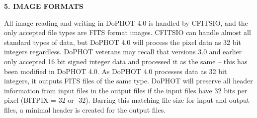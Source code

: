\centerline{\bf 5.  IMAGE FORMATS}

All image reading and writing in DoPHOT 4.0 is handled 
by CFITSIO, and the only accepted file types are FITS format images.  
CFITSIO can handle almost all standard types of data, but DoPHOT 
4.0 will process the pixel data as 32 bit integers regardless.  DoPHOT 
veterans may recall that versions 3.0 and earlier only accepted 16 bit 
signed integer data and processed it as the same -- this has been 
modified in DoPHOT 4.0.  As DoPHOT 4.0 processes data as 32 bit 
integers, it outputs FITS files of the same type.  DoPHOT will preserve all
header information from input files in the output files if the input
files have 32 bits per pixel (BITPIX = 32 or -32).  Barring this matching
file size for input and output files, a minimal header is created for the 
output files.

